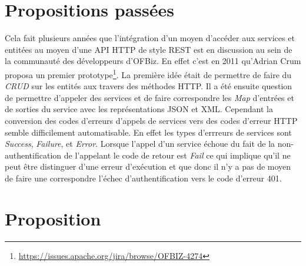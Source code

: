 \documentclass[a4paper, 11pt]{report}
\begin{document}
\section{Propositions passées}

Cela fait plusieurs années que l'intégration d'un moyen d'accéder aux
services et entitées au moyen d'une API HTTP de style REST est en
discussion au sein de la communauté des développeurs d'OFBiz. En effet
c'est en 2011 qu'Adrian Crum proposa un premier
prototype\footnote{\url{https://issues.apache.org/jira/browse/OFBIZ-4274}}. La
première idée était de permettre de faire du \emph{CRUD} sur les
entités aux travers des méthodes HTTP. Il a été ensuite question de
permettre d'appeler des services et de faire correspondre les
\emph{Map} d'entrées et de sorties du service avec les représentations
JSON et XML. Cependant la conversion des codes d'erreurs d'appels de
services vers des codes d'erreur HTTP semble difficilement
automatisable. En effet les types d'errreurs de services sont
\emph{Success}, \emph{Failure}, et \emph{Error}. Lorsque l'appel d'un
service échoue du fait de la non-authentification de l'appelant le
code de retour est \emph{Fail} ce qui implique qu'il ne peut être
distinguer d'une erreur d'exécution et que donc il n'y a pas de moyen
de faire une correspondre l'échec d'authentification vers le code
d'erreur 401.

\section{Proposition}
\end{document}
